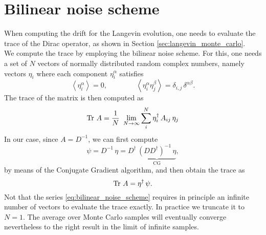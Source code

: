 \section*{Bilinear noise scheme}
When computing the drift for the Langevin evolution, one needs to evaluate the trace of the Dirac operator, as shown in Section \ref{sec:langevin_monte_carlo}. \\
We compute the trace by employing the bilinear noise scheme. For this, one needs a set of $N$ vectors of normally distributed random complex numbers, namely vectors $\eta_i$ where each component $\eta_i^\alpha$ satisfies
\begin{equation*}
    \left\langle \eta_i^{\alpha} \right\rangle = 0, \qquad\qquad \left\langle \eta_i^{\alpha}\eta_j^{\beta} \right\rangle = \delta_{i,j} \, \delta^{\alpha \beta}.
\end{equation*}
The trace of the matrix is then computed as 
\begin{equation}
    \operatorname{\text{Tr} \,} {A} = \frac{1}{N} \ \lim_{N \to \infty} \sum_i^N \eta_i^{\dagger} \, A_{ij} \, \eta_j
    \label{eq:bilinear_noise_scheme}
\end{equation}
In our case, since $A = D^{-1}$, we can first compute
\begin{equation*}
    \psi = D^{-1} \, \eta = D^\dagger \, \underbrace{(D D^\dagger)^{-1} \, \eta}_{\text{CG}},
\end{equation*}
by means of the Conjugate Gradient algorithm, and then obtain the trace as 
\begin{equation*}
    \operatorname{\text{Tr} \,} {A} = \eta^{\dagger} \, \psi.
\end{equation*}
Not that the series \eqref{eq:bilinear_noise_scheme} requires in principle an infinite number of vectors to evaluate the trace exactly. In practice we truncate it to $N=1$. The average over Monte Carlo samples will eventually converge nevertheless to the right result in the limit of infinite samples. \\~\\
